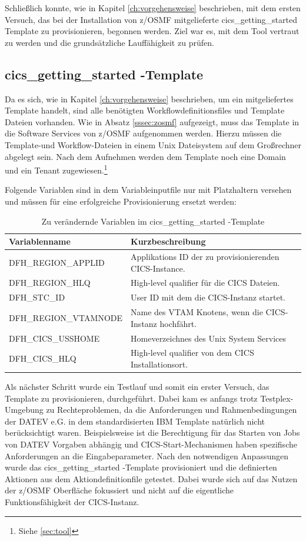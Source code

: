 Schließlich konnte, wie in Kapitel \ref{ch:vorgehensweise} beschrieben, mit dem ersten Versuch, das bei der Installation von z/OSMF mitgelieferte \glqq cics\_getting\_started\grqq{} Template zu provisionieren, begonnen werden.
Ziel war es, mit dem Tool vertraut zu werden und die grundsätzliche Lauffähigkeit zu prüfen.

\subsection{\glqq cics\_getting\_started \grqq-Template}\label{ssec:cgs}
Da es sich, wie in Kapitel \ref{ch:vorgehensweise} beschrieben, um ein mitgeliefertes Template handelt, sind alle benötigten Workflowdefinitionsfiles und Template Dateien vorhanden.
Wie in Absatz \ref{sssec:zosmf} aufgezeigt, muss das Template in die Software Services von z/OSMF aufgenommen werden.
Hierzu müssen die Template-und Workflow-Dateien in einem Unix Dateisystem auf dem Großrechner abgelegt sein. 
Nach dem Aufnehmen werden dem Template noch eine Domain und ein Tenant zugewiesen.\footnote{Siehe \ref{sec:tool}}

Folgende Variablen sind in dem Variableinputfile nur mit Platzhaltern versehen und müssen für eine erfolgreiche Provisionierung ersetzt werden:
\begin{table}[h]
\centering
\begin{tabularx}{\textwidth}{X|X}
Variablenname & Kurzbeschreibung \\
\hline
DFH\_REGION\_APPLID & Applikations ID der zu provisionierenden CICS-Instance. \\
\hline
DFH\_REGION\_HLQ & High-level qualifier für die CICS Dateien.\\
\hline
DFH\_STC\_ID & User ID mit dem die CICS-Instanz startet. \\
\hline
DFH\_REGION\_VTAMNODE & Name des VTAM Knotens, wenn die CICS-Instanz hochfährt. \\
\hline
DFH\_CICS\_USSHOME & Homeverzeichnes des Unix System Services \\
\hline
DFH\_CICS\_HLQ & High-level qualifier von dem CICS Installationsort. \\
\end{tabularx}
\caption{Zu verändernde Variablen im \glqq cics\_getting\_started \grqq-Template}
\label{tab:cgsvars}
\end{table}

Als nächster Schritt wurde ein Testlauf und somit ein erster Versuch, das Template zu provisionieren, durchgeführt.
Dabei kam es anfangs trotz Testplex-Umgebung zu Rechteproblemen, da die Anforderungen und Rahmenbedingungen der DATEV e.G. in dem standardisierten IBM Template natürlich nicht berücksichtigt waren.
Beispielsweise ist die Berechtigung für das Starten von Jobs von DATEV Vorgaben abhängig und CICS-Start-Mechanismen haben spezifische Anforderungen an die Eingabeparameter.
Nach den notwendigen Anpassungen wurde das \glqq cics\_getting\_started \grqq-Template provisioniert und die definierten Aktionen aus dem Aktiondefinitionfile getestet.
Dabei wurde sich auf das Nutzen der z/OSMF Oberfläche fokussiert und nicht auf die eigentliche Funktionsfähigkeit der CICS-Instanz. 

